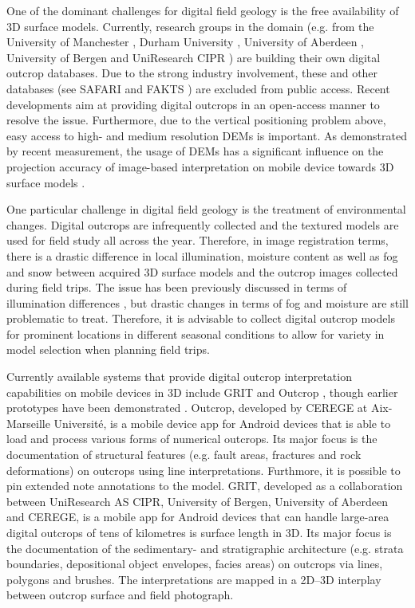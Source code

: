 \documentclass[review]{elsarticle}
\begin{document}
One of the dominant challenges for digital field geology is the free availability of 3D surface models. Currently, research groups in the domain (e.g. from the University of Manchester \cite{Hodgetts2013}, Durham University \cite{McCaffrey2005}, University of Aberdeen \cite{Howell2014}, University of Bergen and UniResearch CIPR \cite{Dreyer1993}) are building their own digital outcrop databases. Due to the strong industry involvement, these and other databases (see SAFARI \cite{Dreyer1993} and FAKTS \cite{Colombera2012a}) are excluded from public access. Recent developments aim at providing digital outcrops in an open-access manner \cite{Cawood2018} to resolve the issue. Furthermore, due to the vertical positioning problem above, easy access to high- and medium resolution \glspl{DEM} is important. As demonstrated by recent measurement, the usage of \glspl{DEM} has a significant influence on the projection accuracy of image-based interpretation on mobile device towards 3D surface models \cite{Kehl2017_VGC}.

One particular challenge in digital field geology is the treatment of environmental changes. Digital outcrops are infrequently collected and the textured models are used for field study all across the year. Therefore, in image registration terms, there is a drastic difference in local illumination, moisture content as well as fog and snow between acquired 3D surface models and the outcrop images collected during field trips. The issue has been previously discussed in terms of illumination differences \cite{Kehl2017_PHOR}, but drastic changes in terms of fog and moisture are still problematic to treat. Therefore, it is advisable to collect digital outcrop models for prominent locations in different seasonal conditions to allow for variety in model selection when planning field trips.

Currently available systems that provide digital outcrop interpretation capabilities on mobile devices in 3D include \gls{GRIT} \cite{Kehl2016_VGCabstract} and Outcrop \cite{Viseur2014_VGCabstract}, though earlier prototypes have been demonstrated \cite{Hama2013}. Outcrop, developed by \gls{CEREGE} at Aix-Marseille Universit\'{e}, is a mobile device app for Android devices that is able to load and process various forms of numerical outcrops. Its major focus is the documentation of structural features (e.g. fault areas, fractures and rock deformations) on outcrops using line interpretations. Furthmore, it is possible to pin extended note annotations to the model. \gls{GRIT}, developed as a collaboration between UniResearch AS CIPR, University of Bergen, University of Aberdeen and \gls{CEREGE}, is a mobile app for Android devices that can handle large-area digital outcrops of tens of kilometres is surface length in 3D. Its major focus is the documentation of the sedimentary- and stratigraphic architecture (e.g. strata boundaries, depositional object envelopes, facies areas) on outcrops via lines, polygons and brushes. The interpretations are mapped in a 2D--3D interplay between outcrop surface and field photograph.
\end{document}
